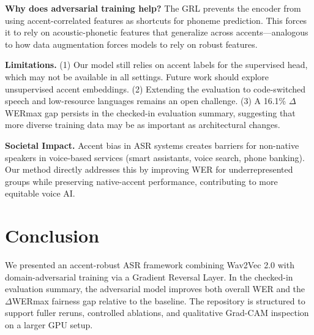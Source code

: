 \documentclass[10pt,twocolumn,letterpaper]{article}
\begin{document}
\textbf{Why does adversarial training help?} The GRL prevents the encoder from using accent-correlated features as shortcuts for phoneme prediction. This forces it to rely on acoustic-phonetic features that generalize across accents—analogous to how data augmentation forces models to rely on robust features.

\textbf{Limitations.} (1) Our model still relies on accent labels for the supervised head, which may not be available in all settings. Future work should explore unsupervised accent embeddings. (2) Extending the evaluation to code-switched speech and low-resource languages remains an open challenge. (3) A 16.1\% $\Delta$WERmax gap persists in the checked-in evaluation summary, suggesting that more diverse training data may be as important as architectural changes.

\textbf{Societal Impact.} Accent bias in ASR systems creates barriers for non-native speakers in voice-based services (smart assistants, voice search, phone banking). Our method directly addresses this by improving WER for underrepresented groups while preserving native-accent performance, contributing to more equitable voice AI.

\section{Conclusion}

We presented an accent-robust ASR framework combining Wav2Vec 2.0 with domain-adversarial training via a Gradient Reversal Layer. In the checked-in evaluation summary, the adversarial model improves both overall WER and the $\Delta$WERmax fairness gap relative to the baseline. The repository is structured to support fuller reruns, controlled ablations, and qualitative Grad-CAM inspection on a larger GPU setup.
\end{document}
